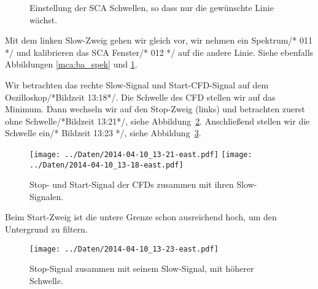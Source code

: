 \begin{figure}[htbp]
    \centering
    \hfill
    \caption{%
        Einstellung der SCA Schwellen, so dass nur die gewünschte Linie wächst.
    }
    \label{mca:ba_spek_sca}
\end{figure}

Mit dem linken Slow-Zweig gehen wir gleich vor, wir nehmen ein Spektrum/* 011
*/ und kalibrieren das SCA Fenster/* 012 */ auf die andere Linie. Siehe
ebenfalls Abbildungen \ref{mca:ba_spek} und \ref{mca:ba_spek_sca}.

Wir betrachten das rechte Slow-Signal und Start-CFD-Signal auf dem
Oszilloskop/*Bildzeit 13:18*/. Die Schwelle des CFD stellen wir auf das
Minimum. Dann wechseln wir auf den Stop-Zweig (links) und betrachten zuerst
ohne Schwelle/*Bildzeit 13:21*/, siehe
Abbildung~\ref{fig:ba_start_slow_baseline}. Anschließend stellen wir die
Schwelle ein/* Bildzeit 13:23 */, siehe Abbildung~\ref{fig:ba_start_slow}.

\begin{figure}[htbp]
    \centering
    \texttt{[image: ../Daten/2014-04-10\_13-21-east.pdf]}
    \hfill
    \texttt{[image: ../Daten/2014-04-10\_13-18-east.pdf]}
    \caption{%
        Stop- und Start-Signal der CFDs zusammen mit ihren Slow-Signalen.
    }
    \label{fig:ba_start_slow_baseline}
\end{figure}

Beim Start-Zweig ist die untere Grenze schon ausreichend hoch, um den
Untergrund zu filtern.

\begin{figure}[htbp]
    \texttt{[image: ../Daten/2014-04-10\_13-23-east.pdf]}
    \caption{%
        Stop-Signal zusammen mit seinem Slow-Signal, mit höherer Schwelle.
    }
    \label{fig:ba_start_slow}
\end{figure}

